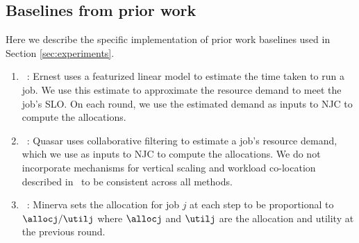 \subsection{Baselines from prior work}
Here we describe the specific implementation of prior work baselines used in Section \ref{sec:experiments}.
\begin{enumerate}[label=\arabic*)]

\item \ernest~\cite{venkataraman2016ernest}:
Ernest uses a featurized linear model  to estimate the
time taken to run a job.
We use this estimate to approximate the resource demand to meet the job's SLO.
On each round, we use the estimated demand as inputs to NJC to compute the allocations.
\vspace{-0.05in}

\item \quasar~\cite{delimitrou2014quasar}:
Quasar uses collaborative filtering to estimate a job's resource demand, which we
use as inputs to NJC to compute the allocations.
We do not incorporate mechanisms for vertical scaling and workload co-location described
in~\cite{delimitrou2014quasar} to be consistent across all methods.
\vspace{-0.05in}

\item \minerva~\cite{nathan2019end}: 
Minerva sets the allocation for
job $j$ at each step to be proportional to $\allocj/\utilj$ where $\allocj$ and $\utilj$ are the
allocation and utility at the previous round.


\end{enumerate}
